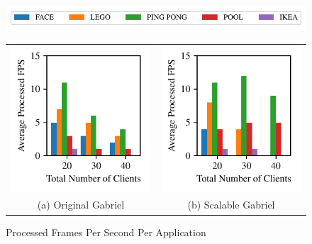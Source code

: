 \begin{figure}
	\begin{center}
		\includegraphics[width=\linewidth]{FIGS/fig-alloc-latency-legend.pdf}
		\begin{tabular}{c@{}c}
			\includegraphics[width=.5\linewidth]{FIGS/fig-eval-fps-baseline.pdf}
			            & \includegraphics[width=.5\linewidth]{FIGS/fig-eval-fps-cpushares.pdf} \\
			{\small (a) Original Gabriel} & {\small (b) Scalable Gabriel}                                                
		\end{tabular}
	\end{center}
	\caption{\small Processed Frames Per Second Per Application}
	\label{fig:frame-fps}
\end{figure}

